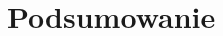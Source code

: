 \documentclass[12pt]{article}
\begin{document}


\pagebreak
\section{Podsumowanie}

\pagebreak

\begin{thebibliography}{9}


\end{thebibliography}
\end{document}
